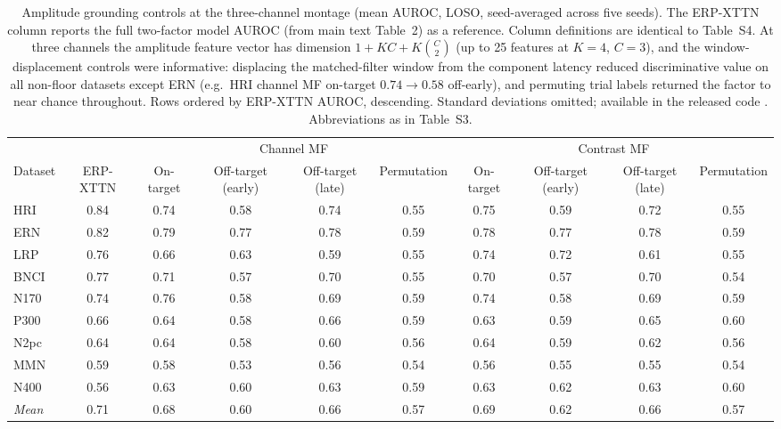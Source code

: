 \begin{table}[t]
\centering
\setlength{\tabcolsep}{5pt}
\caption{%
Amplitude grounding controls at the three-channel montage (mean AUROC, LOSO, seed-averaged across five seeds). The ERP-XTTN column reports the full two-factor model AUROC (from main text Table~2) as a reference. Column definitions are identical to Table~S4. At three channels the amplitude feature vector has dimension $1 + KC + K\binom{C}{2}$ (up to 25 features at $K=4$, $C=3$), and the window-displacement controls were informative: displacing the matched-filter window from the component latency reduced discriminative value on all non-floor datasets except ERN (e.g.\ HRI channel MF on-target $0.74 \to 0.58$ off-early), and permuting trial labels returned the factor to near chance throughout. Rows ordered by ERP-XTTN AUROC, descending. Standard deviations omitted; available in the released code \cite{wyman2026erpxttn_code}. Abbreviations as in Table~S3.%
}
\label{sup:tab-grounding-3-amp}
\begin{tabular}{l c cccc cccc}
\toprule
 & & \multicolumn{4}{c}{Channel MF} & \multicolumn{4}{c}{Contrast MF} \\
\cmidrule(lr){3-6} \cmidrule(lr){7-10}
Dataset & ERP-XTTN & On-target & Off-target (early) & Off-target (late) & Permutation & On-target & Off-target (early) & Off-target (late) & Permutation \\
\midrule
HRI & 0.84 & 0.74 & 0.58 & 0.74 & 0.55 & 0.75 & 0.59 & 0.72 & 0.55 \\
ERN & 0.82 & 0.79 & 0.77 & 0.78 & 0.59 & 0.78 & 0.77 & 0.78 & 0.59 \\
LRP & 0.76 & 0.66 & 0.63 & 0.59 & 0.55 & 0.74 & 0.72 & 0.61 & 0.55 \\
BNCI & 0.77 & 0.71 & 0.57 & 0.70 & 0.55 & 0.70 & 0.57 & 0.70 & 0.54 \\
N170 & 0.74 & 0.76 & 0.58 & 0.69 & 0.59 & 0.74 & 0.58 & 0.69 & 0.59 \\
P300 & 0.66 & 0.64 & 0.58 & 0.66 & 0.59 & 0.63 & 0.59 & 0.65 & 0.60 \\
N2pc & 0.64 & 0.64 & 0.58 & 0.60 & 0.56 & 0.64 & 0.59 & 0.62 & 0.56 \\
MMN & 0.59 & 0.58 & 0.53 & 0.56 & 0.54 & 0.56 & 0.55 & 0.55 & 0.54 \\
N400 & 0.56 & 0.63 & 0.60 & 0.63 & 0.59 & 0.63 & 0.62 & 0.63 & 0.60 \\
\midrule
\textit{Mean} & 0.71 & 0.68 & 0.60 & 0.66 & 0.57 & 0.69 & 0.62 & 0.66 & 0.57 \\
\bottomrule
\end{tabular}
\end{table}
